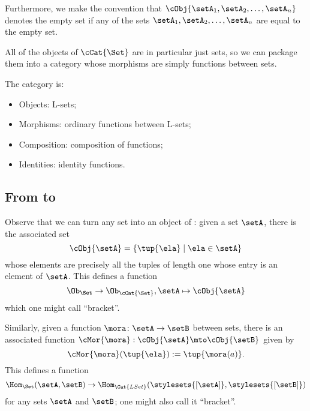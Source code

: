 Furthermore, we make the convention that $ \cObj{\setA_1, \setA_2, \dots, \setA_n}$ denotes the empty set if any of the sets $\setA_1, \setA_2, \dots , \setA_n$ are equal to the empty set. 



All of the objects of $\cCat{\Set}$ are in particular just sets, so we can package them into a category whose morphisms are simply functions between sets.

\begin{ctdefinition}[\cCat{\Set}]
    The category \cCat{\Set} is:

    \begin{itemize}
        \item Objects: L-sets;
        \item Morphisms: ordinary functions between L-sets;
        \item Composition: composition of functions;
        \item Identities: identity functions.
    \end{itemize}
\end{ctdefinition}

\subsection{From \Set to \cCat{\Set}}

Observe that we can turn any set into an object of \cCat{\Set}: given a set $\setA$, there is the associated set
\begin{equation}
\cObj{\setA} = \{ \tup{\ela} \mid \ela \in \setA \}
\end{equation}
whose elements are precisely all the tuples of length one whose entry is an element of $\setA$. This defines a function
\begin{equation}
\Ob_{\Set} \to \Ob_{\cCat{\Set}}, \setA \mapsto \cObj{\setA}
\end{equation}
which one might call ``bracket''. 

Similarly, given a function $\mora \colon \setA \to \setB$ between sets, there is an associated function $\cMor{ \mora }: \cObj{\setA} \mto \cObj{\setB}$ given by 
\begin{equation}
\cMor{ \mora } ( \tup{ \ela }) := \tup{\mora(a)}.
\end{equation}
This defines a function 
\begin{equation}
\Hom_{\Set}(\setA,\setB) \to \Hom_{\Cat{LSet}}(\stylesets{[\setA]},\stylesets{[\setB]})
\end{equation}
for any sets $\setA$ and $\setB$; one might also call it ``bracket''.





